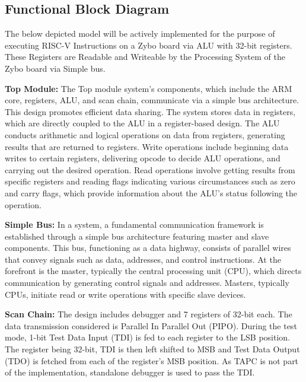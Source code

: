 \documentclass[a4paper,12pt,english]{report}
\begin{document}
\subsection{Functional Block Diagram}
The below depicted model will be actively implemented for the purpose of executing RISC-V Instructions on a Zybo board via ALU with 32-bit registers. These Registers are Readable and Writeable by the Processing System of the Zybo board via Simple bus. 
\vspace{2mm}

\textbf {Top Module:}
The Top module system's components, which include the ARM core, registers, ALU, and scan chain, communicate via a simple bus architecture. This design promotes efficient data sharing. The system stores data in registers, which are directly coupled to the ALU in a register-based design. The ALU conducts arithmetic and logical operations on data from registers, generating results that are returned to registers.
Write operations include beginning data writes to certain registers, delivering opcode to decide ALU operations, and carrying out the desired operation. Read operations involve getting results from specific registers and reading flags indicating various circumstances such as zero and carry flags, which provide information about the ALU's status following the operation.
\vspace{2mm}

\textbf {Simple Bus: }
 In a system, a fundamental communication framework is established through a simple bus architecture featuring master and slave components. This bus, functioning as a data highway, consists of parallel wires that convey signals such as data, addresses, and control instructions. At the forefront is the master, typically the central processing unit (CPU), which directs communication by generating control signals and addresses. Masters, typically CPUs, initiate read or write operations with specific slave devices.
\vspace{2mm}

\textbf {Scan Chain:}
 The design includes debugger and 7 registers of 32-bit each. The data transmission considered is Parallel In Parallel Out (PIPO). During the test mode, 1-bit Test Data Input (TDI) is fed to each register to the LSB position. The register being 32-bit, TDI is then left shifted to MSB and Test Data Output (TDO) is fetched from each of the register's MSB position. As TAPC is not part of the implementation, standalone debugger is used to pass the TDI.
\end{document}

